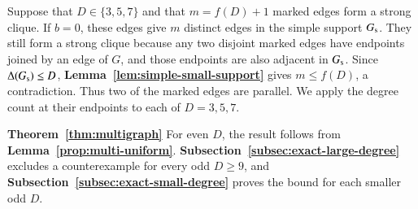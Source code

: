 

Suppose that $D\in\{3,5,7\}$ and that $m=f(D)+1$ marked edges form
a strong clique. If $b=0$, these edges give $m$ distinct edges in
the simple support $G_{\rm s}$. They still form a strong clique
because any two disjoint marked edges have endpoints joined by an
edge of $G$, and those endpoints are also adjacent in $G_{\rm s}$. Since
$\Delta(G_{\rm s})\leq D$, \textbf{Lemma~\ref{lem:simple-small-support}}
gives $m\leq f(D)$, a contradiction. Thus two of the marked edges
are parallel. We apply the degree count at their endpoints to each of
$D=3,5,7$.



\begin{lateproof}{\textbf{Theorem~\ref{thm:multigraph}}}
For even $D$, the result follows from \textbf{Lemma~\ref{prop:multi-uniform}}.
\textbf{Subsection~\ref{subsec:exact-large-degree}} excludes a
counterexample for every odd $D\geq9$, and
\textbf{Subsection~\ref{subsec:exact-small-degree}} proves the bound
for each smaller odd $D$.
\end{lateproof}
